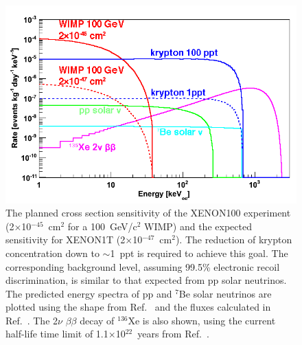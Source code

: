 \begin{figure}[!h]
\centering
\includegraphics[width=0.6\linewidth]{plots/Xe1T/Xe100andXe1Tsensitivity_with100ppt_withLabels.png}
\caption[Projected sensitivity of the XENON1T experiment]{The planned cross section sensitivity of the XENON100 experiment (2$\times$10$^{-45}$~cm$^{2}$ for a 100~GeV/c$^{2}$ WIMP) and the expected sensitivity for XENON1T (2$\times$10$^{-47}$~cm$^{2}$). The reduction of krypton concentration down to $\sim$1~ppt is required to achieve this goal. The corresponding background level, assuming 99.5\% electronic recoil discrimination, is similar to that expected from pp solar neutrinos. The predicted energy spectra of pp and $^{7}$Be solar neutrinos are plotted using the shape from Ref.~\cite{SolarNeutrinoSpectra} and the fluxes calculated in Ref.~\cite{SolarNeutrinoFlux}. The 2$\nu$ $\beta\beta$ decay of $^{136}$Xe is also shown, using the current half-life time limit of 1.1$\times$10$^{22}$~years from Ref.~\cite{DoubleBetaLimitDAMA}.}
\label{figXe1Tsensitivity}
\end{figure}

